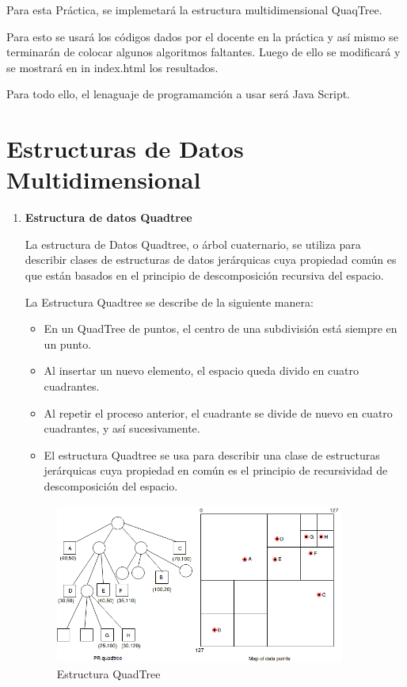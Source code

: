 \documentclass{article}
\begin{document}
	Para esta Práctica, se implemetará la estructura multidimensional QuaqTree.

    Para esto se usará los códigos dados por el docente en la práctica y así mismo se terminarán de colocar algunos algoritmos faltantes. Luego de ello se modificará y se mostrará en in index.html los resultados.

    Para todo ello, el lenaguaje de programamción a usar será Java Script.
	
	
	\section{Estructuras de Datos Multidimensional}\label{sec:ejercicios}
	\begin{enumerate}
		\item \textbf{Estructura de datos Quadtree}
		
			La estructura de Datos Quadtree, o árbol cuaternario, se utiliza para describir clases de estructuras de datos jerárquicas cuya propiedad común es que están basados en el principio de descomposición recursiva del espacio.

La Estructura Quadtree se describe de la siguiente manera: 

\begin{itemize}
   \item En un QuadTree de puntos, el centro de una subdivisión está siempre en un punto.
   \item Al insertar un nuevo elemento, el espacio queda divido en cuatro cuadrantes.
   \item Al repetir el proceso anterior, el cuadrante se divide de nuevo en cuatro cuadrantes, y así sucesivamente.
   \item El estructura Quadtree se usa para describir una clase de estructuras jerárquicas cuya propiedad en común es el principio de recursividad de descomposición del espacio.
\end{itemize}	

\begin{figure}[H]
\centering
\includegraphics[width=0.9\textwidth]{Img/Quadtree.jpg}
\caption{Estructura QuadTree}
\end{figure}

\end{enumerate}
\end{document}

